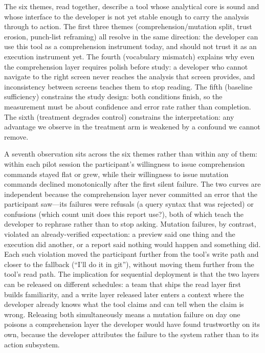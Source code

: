 \medskip\noindent
The six themes, read together, describe a tool whose analytical core is sound
and whose interface to the developer is not yet stable enough to carry the
analysis through to action. The first three themes (comprehension/mutation
split, trust erosion, punch-list reframing) all resolve in the same direction:
the developer can use this tool as a comprehension instrument today, and should
not trust it as an execution instrument yet. The fourth (vocabulary mismatch)
explains why even the comprehension layer requires polish before study: a
developer who cannot navigate to the right screen never reaches the analysis
that screen provides, and inconsistency between screens teaches them to stop
reading. The fifth (baseline sufficiency) constrains the study design: both
conditions finish, so the measurement must be about confidence and error rate
rather than completion. The sixth (treatment degrades control) constrains the
interpretation: any advantage we observe in the treatment arm is weakened by a
confound we cannot remove.

A seventh observation sits across the six themes rather than within any of them:
within each pilot session the participant's willingness to issue comprehension
commands stayed flat or grew, while their willingness to issue mutation commands
declined monotonically after the first silent failure. The two curves are
independent because the comprehension layer never committed an error that the
participant saw---its failures were refusals (a query syntax that was rejected) or
confusions (which count unit does this report use?), both of which teach the
developer to rephrase rather than to stop asking. Mutation failures, by contrast,
violated an already-verified expectation: a preview said one thing and the
execution did another, or a report said nothing would happen and something did.
Each such violation moved the participant further from the tool's write path and
closer to the fallback (``I'll do it in git''), without moving them further from
the tool's read path. The implication for sequential deployment is that the two
layers can be released on different schedules: a team that ships the read layer
first builds familiarity, and a write layer released later enters a context where
the developer already knows what the tool claims and can tell when the claim is
wrong. Releasing both simultaneously means a mutation failure on day one poisons a
comprehension layer the developer would have found trustworthy on its own, because
the developer attributes the failure to the system rather than to its action
subsystem.

